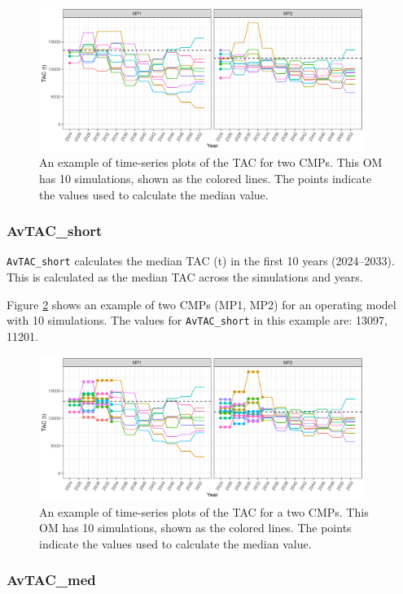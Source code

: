 \documentclass[
]{article}
\begin{document}
\begin{figure}
\includegraphics[width=400px]{../../img/PMs/C1} \caption{An example of time-series plots of the TAC for two CMPs. This OM has 10 simulations, shown as the colored lines. The points indicate the values used to calculate the median value.}\label{fig:C1}
\end{figure}

\hypertarget{avtac_short}{%
\subsubsection{AvTAC\_short}\label{avtac_short}}

\texttt{AvTAC\_short} calculates the median TAC (t) in the first 10 years (2024--2033). This is calculated as the median TAC across the simulations and years.

Figure \ref{fig:AvC10} shows an example of two CMPs (MP1, MP2) for an operating model with 10 simulations. The values for \texttt{AvTAC\_short} in this example are: 13097, 11201.

\begin{figure}
\includegraphics[width=400px]{../../img/PMs/AvTAC_short} \caption{An example of time-series plots of the TAC for a two CMPs. This OM has 10 simulations, shown as the colored lines. The points indicate the values used to calculate the median value.}\label{fig:AvC10}
\end{figure}

\hypertarget{avtac_med}{%
\subsubsection{AvTAC\_med}\label{avtac_med}}
\end{document}
